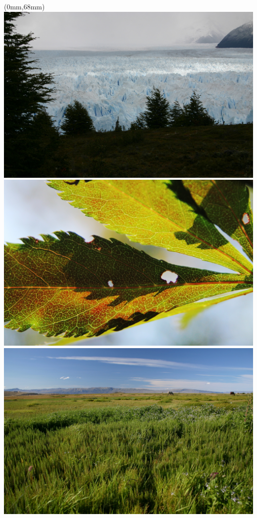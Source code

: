 \documentclass{beamer}
\begin{document}
\begin{frame}
  \begin{textblock*}{4.3cm}(0mm,68mm)%
    \includegraphics[width=\textwidth]{figs/random/sea3.jpg}
    \includegraphics[width=\textwidth]{figs/random/leaves3.jpg}
    \includegraphics[width=\textwidth]{figs/random/arg1.jpg}
  \end{textblock*}
\end{frame}
\end{document}
